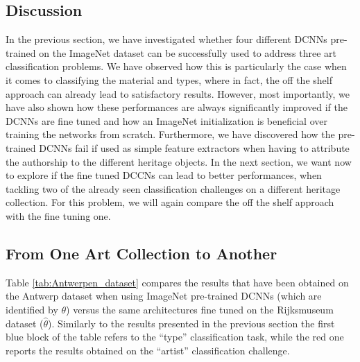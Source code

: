 \documentclass[runningheads]{llncs}
\begin{document}
\subsection{Discussion}
\label{subsec: RijksDiscussion}
In the previous section, we have investigated whether four different DCNNs pre-trained on the ImageNet dataset can be successfully used to address three art classification problems. We have observed how this is particularly the case when it comes to classifying the material and types, where in fact, the off the shelf approach can already lead to satisfactory results. However, most importantly, we have also shown how these performances are always significantly improved if the DCNNs are fine tuned and how an ImageNet initialization is beneficial over training the networks from scratch. Furthermore, we have discovered how the pre-trained DCNNs fail if used as simple feature extractors when having to attribute the authorship to the different heritage objects. In the next section, we want now to explore if the fine tuned DCCNs can lead to better performances, when tackling two of the already seen classification challenges on a different heritage collection. For this problem, we will again compare the off the shelf approach with the fine tuning one.


\subsection{From One Art Collection to Another} 
\label{subsec: from_one_to_another}

Table \ref{tab:Antwerpen_dataset} compares the results that have been obtained on the Antwerp dataset when using ImageNet pre-trained DCNNs (which are identified by $\theta$) versus the same architectures fine tuned on the Rijksmuseum dataset ($\widehat{\theta}$). Similarly to the results presented in the previous section the first blue block of the table refers to the ``type'' classification task, while the red one reports the results obtained on the ``artist'' classification challenge.
\end{document}
